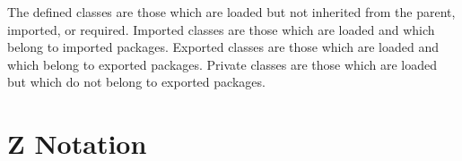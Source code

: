 \documentclass[a4paper,9pt]{article}
\begin{document}
The defined classes are those which are loaded but not inherited from the parent, imported,
or required.
Imported classes are those which are loaded and which belong to imported packages.
Exported classes are those which are loaded and which belong to exported packages.
Private classes are those which are loaded but which do not belong to exported packages.
\newpage
\section{Z Notation}
\label{cha:znot}

\makeatletter %

\def\symtab{\setbox0=\vbox\bgroup \def\\{\cr}
        \halign\bgroup\strut$##$\hfil&\quad##\hfil\cr}
\def\endsymtab{\crcr\egroup\egroup
        \dimen0=\ht0 \divide\dimen0 by2 \advance\dimen0 by\ht\strutbox
        \splittopskip=\ht\strutbox \vbadness=10000
        \predisplaypenalty=0
        $$\halign{##\cr\hbox to\linewidth{%
                \valign{##\vfil\cr
                        \setbox1=\vsplit0 to\dimen0 \unvbox1\cr 
                        \noalign{\hfil}\unvbox0\cr
                        \noalign{\hfil}}}\cr 
                \noalign{\prevdepth=\dp\strutbox}}$$
        \global\@ignoretrue}

\makeatother 
\end{document}
